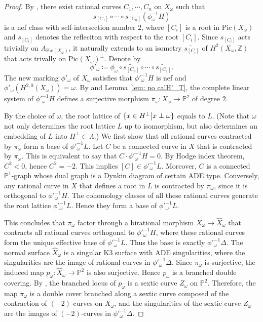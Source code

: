 \documentclass[
]{article}
\begin{document}
\emph{Proof.} By
\cite[Chapter 8, \S 2, Corollary 2.9]{huybrechts2016lectures}, there
exist rational curves \(C_1,\cdots,C_n\) on \(X_\omega\) such that
\[s_{[C_1]}\circ\cdots\circ s_{[C_n]}(\phi_\omega^{-1}H)\] is a nef
class with self-intersection number \(2\), where \([C_i]\) is a root in
\(\mathrm{Pic}(X_\omega)\) and \(s_{[C_i]}\) denotes the refleciton with
respect to the root \([C_i]\). Since \(s_{[C_i]}\) acts trivially on
\(A_{\mathrm{Pic}(X_\omega)}\), it naturally extends to an isometry
\(\widetilde{s_{[C_i]}}\) of \(H^2(X_\omega,\mathbb{Z})\) that acts
trivally on \(\mathrm{Pic}(X_\omega)^\perp\). Denote by
\[\phi'_\omega\coloneqq \phi_\omega\circ \widetilde{s_{[C_n]}}\circ\cdots\circ \widetilde{s_{[C_1]}}.\]
The new marking \(\phi'_\omega\) of \(X_\omega\) satisfies that
\(\phi'^{-1}_\omega H\) is nef and
\(\phi'_\omega(H^{2,0}(X_\omega))=\omega\). By
\cite[Proposition 1.7]{urabe1988combinations} and Lemma
\ref{lem: no calH'_T}, the complete linear system of
\(\phi'^{-1}_\omega H\) defines a surjective morphism
\(\pi_\omega\colon X_\omega\to \mathbb{P}^2\) of degree \(2\).

By the choice of \(\omega\), the root lattice of
\(\{x\in H^\perp \big{|} x \perp \omega \}\) equals to \(L\). (Note that
\(\omega\) not only determines the root lattice \(L\) up to isomorphism,
but also determines an embedding of \(L\) into
\(H^\perp\subset\Lambda\).) We first show that all rational curves
contracted by \(\pi_\omega\) form a base of \(\phi'^{-1}_\omega L\). Let
\(C\) be a connected curve in \(X\) that is contracted by
\(\pi_\omega\). This is equivalent to say that
\(C\cdot \phi'^{-1}_\omega H = 0\). By Hodge index theorem, \(C^2<0\),
hence \(C^2=-2\). This implies \([C]\in \phi'^{-1}_\omega L\). Moreover,
\(C\) is a connected \(\mathbb{P}^1\)-graph whose dual graph is a Dynkin
diagram of certain ADE type. Conversely, any rational curve in \(X\)
that defines a root in \(L\) is contracted by \(\pi_\omega\), since it
is orthogonal to \(\phi'^{-1}_\omega H\). The cohomology classes of all
these rational curves generate the root lattice \(\phi'^{-1}_\omega L\).
Hence they form a base of \(\phi'^{-1}_\omega L\).

This concludes that \(\pi_\omega\) factor through a birational morphism
\(X_\omega \to \widehat{X}_\omega\) that contracts all rational curves
orthogonal to \(\phi'^{-1}_\omega H\), where these rational curves form
the unique effective base of \(\phi'^{-1}_\omega L\). Thus the base is
exactly \(\phi'^{-1}_\omega \Delta\). The normal surface
\(\widehat{X}_\omega\) is a singular K3 surface with ADE singularities,
where the singularities are the image of rational curves in
\(\phi'^{-1}_\omega \Delta\). Since \(\pi_\omega\) is surjective, the
induced map \(p_\omega\colon \widehat{X}_\omega \to \mathbb{P}^2\) is
also surjective. Hence \(p_\omega\) is a branched double covering. By
\cite[III, \S 7, Theorem 7.2]{barth2004compact}, the branched locus of
\(p_\omega\) is a sextic curve \(Z_\omega\) on \(\mathbb{P}^2\).
Therefore, the map \(\pi_\omega\) is a double cover branched along a
sextic curve composed of the contraction of \((-2)\)-curves on
\(X_\omega\), and the singularities of the sextic curve \(Z_\omega\) are
the images of \((-2)\)-curves in \(\phi'^{-1}_\omega \Delta\).~◻
\end{document}
